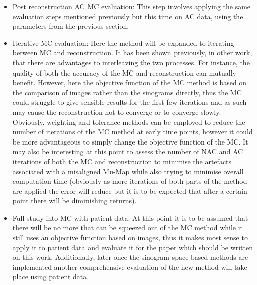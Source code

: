 \begin{itemize}
                \item Post reconstruction \gls{AC} \gls{MC} evaluation: This step involves applying the same evaluation steps mentioned previously but this time on \gls{AC} data, using the parameters from the previous section. 
    
                \item Iterative \gls{MC} evaluation: Here the method will be expanded to iterating between \gls{MC} and reconstruction. It has been shown previously, in other work, that there are advantages to interleaving the two processes. For instance, the quality of both the accuracy of the \gls{MC} and reconstruction can mutually benefit. However, here the objective function of the \gls{MC} method is based on the comparison of images rather than the sinograms directly, thus the \gls{MC} could struggle to give sensible results for the first few iterations and as such may cause the reconstruction not to converge or to converge slowly. Obviously, weighting and tolerance methods can be employed to reduce the number of iterations of the \gls{MC} method at early time points, however it could be more advantageous to simply change the objective function of the \gls{MC}. It may also be interesting at this point to assess the number of \gls{NAC} and \gls{AC} iterations of both the \gls{MC} and reconstruction to minimise the artefacts associated with a misaligned \gls{Mu-Map} while also trying to minimise overall computation time (obviously as more iterations of both parts of the method are applied the error will reduce but it is to be expected that after a certain point there will be diminishing returns).
    
                \item Full study into \gls{MC} with patient data: At this point it is to be assumed that there will be no more that can be squeezed out of the \gls{MC} method while it still uses an objective function based on images, thus it makes most sense to apply it to patient data and evaluate it for the paper which should be written on this work. Additionally, later once the sinogram space based methods are implemented another comprehensive evaluation of the new method will take place using patient data.
    

\end{itemize}

